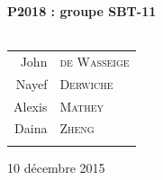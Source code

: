 \begin{titlepage}
\begin{center}
{\begin{center}
\begin{tabular}{rl}
\end{tabular}
\end{center}
\vfill
\begin{center}
  \textbf{P2018 : groupe SBT-11} \\~\\
  
\begin{tabular}{rl}

    \quad John &\textsc{de Wasseige} \\
    \quad Nayef &\textsc{Derwiche} \\
    \quad Alexis &\textsc{Mathey} \\
    \quad Daina &\textsc{Zheng} \\ \\
\end{tabular}
\end{center}
}

\vfill

{\large 10 décembre 2015}

\end{center}
\end{titlepage}